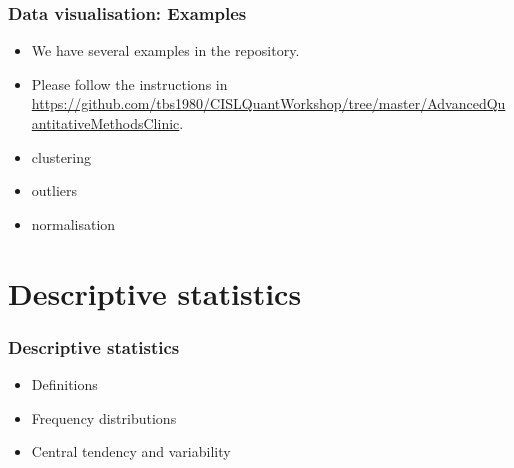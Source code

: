 \documentclass[10pt, compress]{beamer}
\begin{document}
\begin{frame}
    \frametitle{Data visualisation: Examples}
    \begin{itemize}
        \item We have several examples in the repository.
        \item Please follow the instructions in \url{https://github.com/tbs1980/CISLQuantWorkshop/tree/master/AdvancedQuantitativeMethodsClinic}.
        \item \alert{clustering}
        \item \alert{outliers}
        \item \alert{normalisation}
    \end{itemize}
\end{frame}

\section{Descriptive statistics}

\begin{frame}
    \frametitle{Descriptive statistics}
    \begin{itemize}
        \item Definitions
        \item Frequency distributions
        \item Central tendency and variability
    \end{itemize}
\end{frame}
\end{document}
